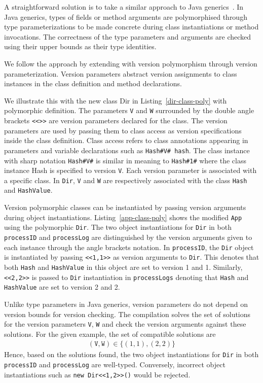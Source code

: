 A straightforward solution is to take a similar approach to Java generics~\cite{igarashi_featherweight_2001, bracha1998making}. 
In Java generics, types of fields or method arguments are polymorphised through type parameterizations to be made concrete 
during class instantiations or method invocations. The correctness of the 
type parameters and arguments are checked using their upper bounds as their type identities.

We follow the approach by extending \lang{} with version polymorphism through version parameterization. Version parameters abstract 
version assignments to class instances in the class definition and method declarations.

We illustrate this with the new class Dir in Listing~\ref{dir-class-poly} with polymorphic definition. The parameters \texttt{V} 
and \texttt{W} surrounded by the double angle brackets \texttt{<<>>} are version parameters declared for the class.
The version parameters are used by passing them to class access as version specifications inside the class definition. 
Class access refers to class annotations appearing in parameters and variable declarations such as \texttt{Hash\#V\# hash}. 
The class instance with sharp notation \texttt{Hash\#V\#} is similar in meaning to \texttt{Hash\#1\#} where the class instance 
Hash is specified to version \texttt{V}. Each version parameter is associated with a specific class. 
In \texttt{Dir}, \texttt{V} and \texttt{W} are respectively associated with the class \texttt{Hash} and \texttt{HashValue}.

Version polymorphic classes can be instantiated by passing version arguments during object instantiations. 
Listing~\ref{app-class-poly} shows the modified \texttt{App} using the polymorphic \texttt{Dir}. 
The two object instantiations for \texttt{Dir} in both \texttt{processID} and \texttt{processLog} are distinguished 
by the version arguments given to each instance through the angle brackets notation. In \texttt{processID}, the \texttt{Dir} 
object is instantiated by passing \texttt{<<1,1>>} as version arguments to \texttt{Dir}. This denotes that both \texttt{Hash} 
and \texttt{HashValue} in this object are set to version 1 and 1. Similarly, \texttt{<<2,2>>} is passed to \texttt{Dir} 
instantiation in \texttt{processLogs} denoting that \texttt{Hash} and \texttt{HashValue} are set to version 2 and 2. 

Unlike type parameters in Java generics, version parameters do not depend on version bounds for version checking. 
The compilation solves the set of solutions for the version parameters \texttt{V}, \texttt{W} and check 
the version arguments against these solutions. For the given example, the set of compatible solutions are
\begin{align*}
(\texttt{V}, \texttt{W}) \in \{ (1,1), (2,2) \}
\end{align*}
Hence, based on the solutions found, the two object instantiations for \texttt{Dir} in both \texttt{processID} and
\texttt{processLog} are well-typed. Conversely, incorrect object instantiations such as \texttt{new Dir<<1,2>>()} 
would be rejected.

